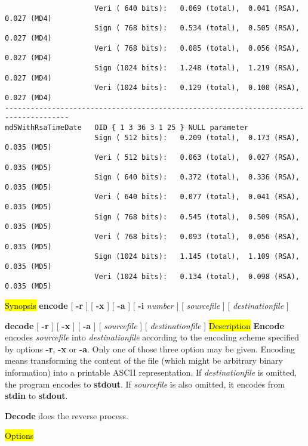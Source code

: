 {\begin{verbatim}
                     Veri ( 640 bits):   0.069 (total),  0.041 (RSA),  0.027 (MD4)  
                     Sign ( 768 bits):   0.534 (total),  0.505 (RSA),  0.027 (MD4)  
                     Veri ( 768 bits):   0.085 (total),  0.056 (RSA),  0.027 (MD4)  
                     Sign (1024 bits):   1.248 (total),  1.219 (RSA),  0.027 (MD4)  
                     Veri (1024 bits):   0.129 (total),  0.100 (RSA),  0.027 (MD4)  
-------------------------------------------------------------------------------------
md5WithRsaTimeDate   OID { 1 3 36 3 1 25 } NULL parameter
                     Sign ( 512 bits):   0.209 (total),  0.173 (RSA),  0.035 (MD5)  
                     Veri ( 512 bits):   0.063 (total),  0.027 (RSA),  0.035 (MD5)  
                     Sign ( 640 bits):   0.372 (total),  0.336 (RSA),  0.035 (MD5)  
                     Veri ( 640 bits):   0.077 (total),  0.041 (RSA),  0.035 (MD5)  
                     Sign ( 768 bits):   0.545 (total),  0.509 (RSA),  0.035 (MD5)  
                     Veri ( 768 bits):   0.093 (total),  0.056 (RSA),  0.035 (MD5)  
                     Sign (1024 bits):   1.145 (total),  1.109 (RSA),  0.035 (MD5)  
                     Veri (1024 bits):   0.134 (total),  0.098 (RSA),  0.035 (MD5)  
\end{verbatim}
}

\label{encode}
\hl{Synopsis}
{\bf encode} [ {\bf -r} ] [ {\bf -x} ] [ {\bf -a} ] [ {\bf -i} {\em number} ] [ {\em sourcefile} ] [ {\em destinationfile} ]

{\bf decode} [ {\bf -r} ] [ {\bf -x} ] [ {\bf -a} ] [ {\em sourcefile} ] [ {\em destinationfile} ]
\hl{Description}
{\bf Encode} encodes {\em sourcefile} into {\em destinationfile} according to the encoding scheme
specified by options {\bf -r}, {\bf -x} or {\bf -a}. Only one of those three option may be given.
Encoding means transforming the content of the file (which might be arbitrary binary information)
into a printable ASCII representation.
If {\em destinationfile} is omitted, the program encodes to {\bf stdout}. 
If {\em sourcefile} is also omitted, it encodes from {\bf stdin} to {\bf stdout}.

{\bf Decode} does the reverse process.
 
\hl{Options}


